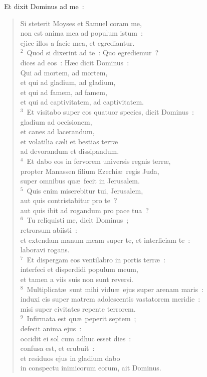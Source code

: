 ~\lettrine[lines=10,image=true,loversize=0.05,lraise=-0.03]{E}{}t dixit Dominus ad me~: \begin{flushleft}\begin{verse}\vspace{6pt}Si steterit Moyses et Samuel coram me,\\ non est anima mea ad populum istum~:\\ ejice illos a facie mea, et egrediantur.\\
${}^{2}$~Quod si dixerint ad te~: Quo egrediemur~?\\ dices ad eos~: H\ae c dicit Dominus~:\\ Qui ad mortem, ad mortem,\\ et qui ad gladium, ad gladium,\\ et qui ad famem, ad famem,\\ et qui ad captivitatem, ad captivitatem.\\
${}^{3}$~Et visitabo super eos quatuor species, dicit Dominus~:\\ gladium ad occisionem,\\ et canes ad lacerandum,\\ et volatilia c\ae li et bestias terr\ae \\ ad devorandum et dissipandum.\\
${}^{4}$~Et dabo eos in fervorem universis regnis terr\ae ,\\ propter Manassen filium Ezechi\ae\ regis Juda,\\ super omnibus qu\ae\ fecit in Jerusalem.\\
${}^{5}$~Quis enim miserebitur tui, Jerusalem,\\ aut quis contristabitur pro te~?\\ aut quis ibit ad rogandum pro pace tua~?\\
${}^{6}$~Tu reliquisti me, dicit Dominus~;\\ retrorsum abiisti~:\\ et extendam manum meam super te, et interficiam te~:\\ laboravi rogans.\\
${}^{7}$~Et dispergam eos ventilabro in portis terr\ae~:\\ interfeci et disperdidi populum meum,\\ et tamen a viis suis non sunt reversi.\\
${}^{8}$~Multiplicat\ae\ sunt mihi vidu\ae\ ejus super arenam maris~:\\ induxi eis super matrem adolescentis vastatorem meridie~:\\ misi super civitates repente terrorem.\\
${}^{9}$~Infirmata est qu\ae\ peperit septem~;\\ defecit anima ejus~:\\ occidit ei sol cum adhuc esset dies~:\\ confusa est, et erubuit~:\\ et residuos ejus in gladium dabo\\ in conspectu inimicorum eorum, ait Dominus.\end{verse}\end{flushleft}


